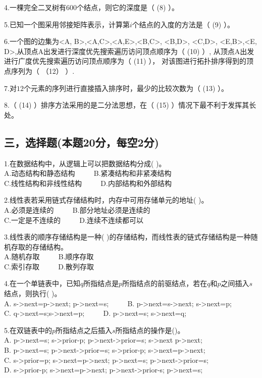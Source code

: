4.一棵完全二叉树有$600$个结点，则它的深度是（ (8) ）。

5.已知一个图采用邻接矩阵表示，计算第$i$个结点的入度的方法是（ (9) ）。

6.一个图的边集为{<A, B>,<A,C>,<A,E>,<B,C>, <B,D>, <C,D>, <E,B>,<E, D>},从顶点A出发进行深度优先搜索遍历访问顶点顺序为（ (10) ）, 从顶点A出发进行广度优先搜索遍历访问顶点顺序为（ (11) ）， 对该图进行拓扑排序得到的顶点序列为（ （12） ）.

7.对$12$个元素的序列进行直接插入排序时，最少的比较次数为（ (13) ）。

8.（ (14) ）排序方法采用的是二分法思想，在（ (15) ）情况下最不利于发挥其长处。

\subsection{三，选择题(本题20分，每空2分)}

1.在数据结构中，从逻辑上可以把数据结构分成( )。 \\
A.动态结构和静态结构 $\qquad$ B.紧凑结构和非紧凑结构 \\
C.线性结构和非线性结构 $\qquad$ D.内部结构和外部结构

2.线性表若采用链式存储结构时，内存中可用存储单元的地址( )。 \\
A.必须是连续的 $\qquad$ B.部分地址必须是连续的 \\
C.一定是不连续的 $\qquad$ D.连续不连续都可以

3.线性表的顺序存储结构是一种(  )的存储结构，而线性表的链式存储结构是一种随机存取的存储结构。 \\
A.随机存取 $\qquad$ B.顺序存取 \\
C.索引存取 $\qquad$ D.散列存取

4.在一个单链表中，已知$q$所指结点是$p$所指结点的前驱结点，若在$q$和$p$之间插入$s$结点，则执行( )。 \\
A. s->next=p->next; p->next=s; $\qquad$ B. p->next=s->next; s->next=p; \\
C. q->next=s;s->next=p; $\qquad$ D. p->next=s; s->next=q;

5.在双链表中的$p$所指结点之后插入$s$所指结点的操作是()。 \\
A. p->next=s; s->prior-p; p->next->prior=s; s->next p->next; \\
B. p->next=s; p->next->prior=s; s->prior-p; s->next=p->next; \\
C. s->prior=p; s->next=p->next; p->next=s; p->next->prior=s; \\
D. s->prior-p; s->next=p->next; p->next->prior-s; p->next=s;

